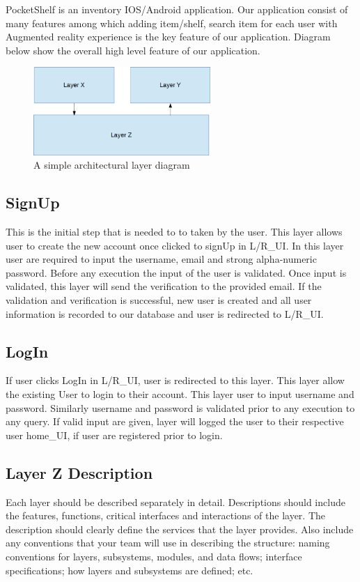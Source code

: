 PocketShelf is an inventory IOS/Android application. Our application consist of many features among which adding item/shelf, search item for each user with Augmented reality experience is the key feature of our application. Diagram below show the overall high level feature of our application.


\begin{figure}[h!]
	\centering
 	\includegraphics[width=0.60\textwidth]{images/layers}
 \caption{A simple architectural layer diagram}
\end{figure}

\subsection{SignUp}
This is the initial step that is needed to to taken by the user. This layer allows user to create the new account once clicked to signUp in L/R\_UI. In this layer user are required to input the username, email and strong alpha-numeric password. Before any execution the input of the user is validated. Once input is validated, this layer will send the verification to the provided email. If the validation and verification is successful, new user is created and all user information is recorded to our database and user is redirected to L/R\_UI.

\subsection{LogIn}
If user clicks LogIn in L/R\_UI, user is redirected to this layer. This layer allow the existing User to login to their account. This layer user to input username and password. Similarly username and password is validated prior to any execution to any query. If valid input are given, layer will logged the user to their respective user home\_UI, if user are registered prior to login.

\subsection{Layer Z Description}
Each layer should be described separately in detail. Descriptions should include the features, functions, critical interfaces and interactions of the layer. The description should clearly define the services that the layer provides. Also include any conventions that your team will use in describing the structure: naming conventions for layers, subsystems, modules, and data flows; interface specifications; how layers and subsystems are defined; etc. 